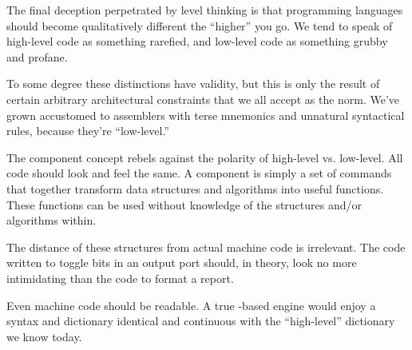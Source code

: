 The final deception perpetrated by level thinking is that programming
languages should become qualitatively different the ``higher'' you go. We
tend to speak of high-level code as something rarefied, and low-level code
as something grubby and profane.

To some degree these distinctions have validity, but this is only the
result of certain arbitrary architectural constraints that we all accept as
the norm. We've grown accustomed to assemblers with terse mnemonics
and unnatural syntactical rules, because they're ``low-level.''

The component concept rebels against the polarity of high-level vs.
low-level. All code should look and feel the same. A component is simply
a set of commands that together transform data structures and
algorithms into useful functions. These functions can be used without
knowledge of the structures and/or algorithms within.

The distance of these structures from actual machine code is
irrelevant. The code written to toggle bits in an output port should,
in theory, look no more intimidating than the code to format a report.

Even machine code should be readable. A true \Forth{}-based
engine would enjoy a syntax and dictionary identical and continuous
with the ``high-level'' dictionary we know today.%

